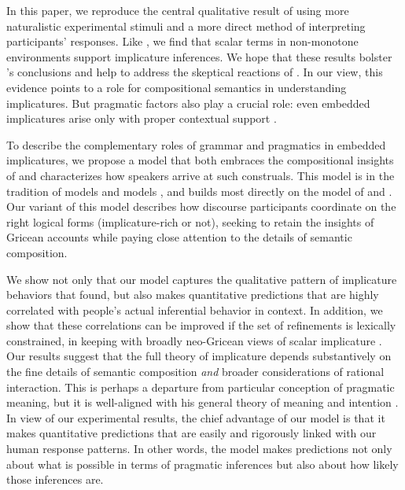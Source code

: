 \documentclass[leqno,12pt]{article}
\begin{document}

In this paper, we reproduce the central qualitative result of
\citet{Chemla:Spector:2011} using more naturalistic experimental
stimuli and a more direct method of interpreting participants'
responses. Like \citeauthor{Chemla:Spector:2011}, we find that scalar
terms in non-monotone environments support implicature inferences. We
hope that these results bolster \citeauthor{Chemla:Spector:2011}'s
conclusions and help to address the skeptical reactions of
\citet{geurts-vantiel:2013:scalar}. In our view, this evidence points
to a role for compositional semantics in understanding
implicatures. But pragmatic factors also play a crucial role: even
embedded implicatures arise only with proper contextual support
\citep{Russell06,ChierchiaFoxSpector08,Geurts:2011,Chemla:Spector:2011}.

To describe the complementary roles of grammar and pragmatics in
embedded implicatures, we propose a model that both embraces the
compositional insights of \citeauthor{ChierchiaFoxSpector08} and
characterizes how speakers arrive at such construals. This model is in
the tradition of  models
\citep{Frank:Goodman:2012,Goodman:Stuhlmuller:2013} and  models \citep{Franke09DISS,Jaeger:2011}, and builds
most directly on the  model of
\citet{Bergen:Goodman:Levy:2012} and
\citet{Bergen:Levy:Goodman:2014}. Our variant of this model describes
how discourse participants coordinate on the right logical forms
(implicature-rich or not), seeking to retain the insights of Gricean
accounts while paying close attention to the details of semantic
composition.

We show not only that our model captures the qualitative pattern of
implicature behaviors that \citeauthor{Chemla:Spector:2011} found, but
also makes quantitative predictions that are highly correlated with people's actual
inferential behavior in context. In addition, we show that these
correlations can be improved if the set of refinements is lexically
constrained, in keeping with broadly neo-Gricean views of scalar
implicature \citep{Horn72,Gazdar79b,Gazdar79a,SchulzVanRooij06}.  Our
results suggest that the full theory of implicature depends
substantively on the fine details of semantic composition \emph{and}
broader considerations of rational interaction. This is perhaps a
departure from  particular conception of pragmatic
meaning, but it is well-aligned with his general theory of meaning and
intention \citep{grice57}.  In view of our experimental results, the chief advantage
of our model is that it makes quantitative predictions that are easily
and rigorously linked with our human response patterns. In other
words, the model makes predictions not only about what is possible in
terms of pragmatic inferences but also about how likely those
inferences are. 
\end{document}
